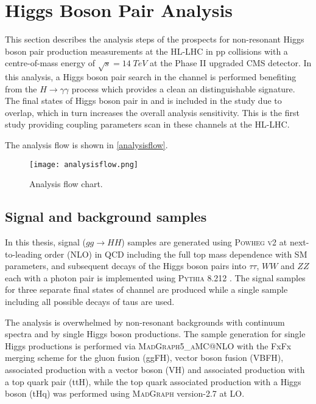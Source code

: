 {\section{Higgs Boson Pair Analysis}

This section describes the analysis steps of the prospects for non-resonant Higgs boson pair production measurements at the HL-LHC in pp collisions with a centre-of-mass energy of $\sqrt{s}=14\;TeV$ at the Phase II upgraded CMS detector. In this analysis, a Higgs boson pair search in the \ttgg channel is performed benefiting from the $H\rightarrow \gamma\gamma$ process which provides a clean an distinguishable signature. The final states of Higgs boson pair in \wwgg and \zzgg is included in the study due to overlap, which in turn increases the overall analysis sensitivity. This is the first study providing coupling parameters scan in these channels at the HL-LHC.

The analysis flow is shown in \autoref{analysisflow}.

\begin{figure}[ht]
	\centering
	\texttt{[image: analysisflow.png]}
	\vspace{2mm}
	\caption{Analysis flow chart.}
	\label{analysisflow}
\end{figure}

\subsection{Signal and background samples}\label{samples_section}

In this thesis, signal ($gg \rightarrow HH$) samples are generated using \textsc{Powheg v2} \cite{Nason2004, Frixione2007, Alioli2010, Heinrich2019} at next-to-leading order (NLO) in QCD including the full top mass dependence with SM parameters, and subsequent decays of the Higgs boson pairs into $\tau\tau$, $WW$ and $ZZ$ each with a photon pair is implemented using \textsc{Pythia 8.212} \cite{Sjstrand2015}. The signal samples for three separate final states of \wwgg channel are produced while a single sample including all possible decays of taus are used.

The analysis is overwhelmed by non-resonant backgrounds with continuum \mgg spectra and by single Higgs boson productions. The sample generation for single Higgs productions is performed via \textsc{MadGraph5\_aMC@NLO} \cite{Alwall2014, Artoisenet2013} with the FxFx merging scheme \cite{Frederix2012} for the gluon fusion (ggFH), vector boson fusion (VBFH), associated production with a vector boson (VH) and associated production with a top quark pair (ttH), while the top quark associated production  with a Higgs boson (tHq) was performed using \textsc{MadGraph} version-2.7 at LO.

}
